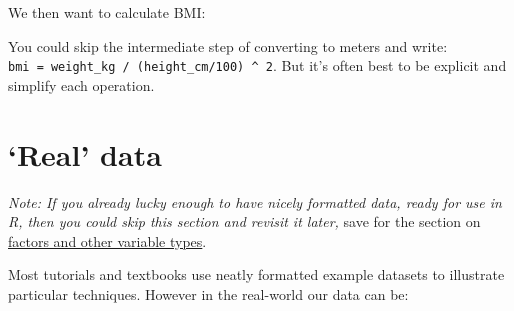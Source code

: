 \documentclass[]{article}
\newenvironment{Shaded}{\begin{snugshade}}{\end{snugshade}}
\newcommand{\CommentTok}[1]{\textcolor[rgb]{0.56,0.35,0.01}{\textit{#1}}}
\newcommand{\DataTypeTok}[1]{\textcolor[rgb]{0.13,0.29,0.53}{#1}}
\newcommand{\DecValTok}[1]{\textcolor[rgb]{0.00,0.00,0.81}{#1}}
\newcommand{\ErrorTok}[1]{\textcolor[rgb]{0.64,0.00,0.00}{\textbf{#1}}}
\newcommand{\FloatTok}[1]{\textcolor[rgb]{0.00,0.00,0.81}{#1}}
\newcommand{\KeywordTok}[1]{\textcolor[rgb]{0.13,0.29,0.53}{\textbf{#1}}}
\newcommand{\NormalTok}[1]{#1}
\newcommand{\OperatorTok}[1]{\textcolor[rgb]{0.81,0.36,0.00}{\textbf{#1}}}
\newcommand{\StringTok}[1]{\textcolor[rgb]{0.31,0.60,0.02}{#1}}
\begin{document}
We then want to calculate BMI:

\begin{Shaded}
\end{Shaded}

You could skip the intermediate step of converting to meters and write:
\texttt{bmi\ =\ weight\_kg\ /\ (height\_cm/100)\ \^{}\ 2}. But it's often best to be explicit and
simplify each operation.

\hypertarget{real-data}{%
\section{`Real' data}\label{real-data}}

\emph{Note: If you already lucky enough to have nicely formatted data, ready for use
in R, then you could skip this section and revisit it later,} save for the
section on \protect\hyperlink{factors-and-numerics}{factors and other variable types}.

Most tutorials and textbooks use neatly formatted example datasets to illustrate
particular techniques. However in the real-world our data can be:
\end{document}
